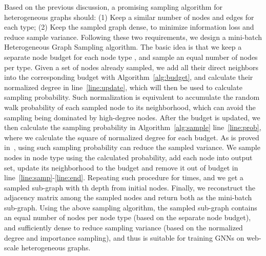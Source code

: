 \documentclass[sigconf]{acmart}
\theoremstyle{definition}
\begin{document}
{Based on the previous discussion, a promising sampling algorithm for heterogeneous graphs should: (1) Keep a similar number of nodes and edges for each type; (2) Keep the sampled graph dense, to minimize information loss and reduce sample variance. Following these two requirements, we design a mini-batch Heterogeneous Graph Sampling algorithm. The basic idea is that we keep a separate node budget  for each node type , and sample an equal number of nodes per type. Given a set of nodes already sampled, we add all their direct neighbors into the corresponding budget with Algorithm~\ref{alg:budget}, and calculate their normalized degree in line~\ref{line:update}, which will then be used to calculate sampling probability. Such normalization is equivalent to accumulate the random walk probability of each sampled node to its neighborhood, which can avoid the sampling being dominated by high-degree nodes. After the budget is updated, we then calculate the sampling probability in Algorithm~\ref{alg:sample} line~\ref{line:prob}, where we calculate the square of normalized degree for each budget. As is proved in~\cite{fastgcn, ladies}, using such sampling probability can reduce the sampled variance. We sample  nodes in node type  using the calculated probability, add each node into output set, update its neighborhood to the budget and remove it out of budget in line~\ref{line:samp}-\ref{line:end}. Repeating such procedure for  times, and we get a sampled sub-graph with th depth from initial nodes. Finally, we reconstruct the adjacency matrix among the sampled nodes and return both as the mini-batch sub-graph. Using the above sampling algorithm, the sampled sub-graph contains an equal number of nodes per node type (based on the separate node budget), and sufficiently dense to reduce sampling variance (based on the normalized degree and importance sampling), and thus is suitable for training GNNs on web-scale heterogeneous graphs.

}
\end{document}
